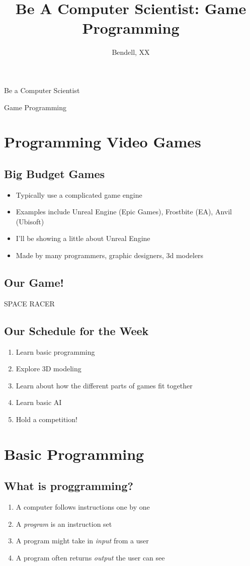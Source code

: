\documentclass[
paper=128mm:96mm,
fontsize=12pt,
pagesize,
parskip=half-,
]{scrartcl}
\title{Be A Computer Scientist: Game Programming}
\author{Bendell, XX}
\date{}
\newcommand{\slide}[1]{#1 \clearpage}
\newcommand{\sectionslide}[1]{\slide{\hfill \vfill \section{#1} \vspace{5em}}}
\newcommand{\subsectionslide}[2]{\vspace*{1em}\slide{\subsection{#1} #2}}
\renewcommand\maketitle
{
	\vspace*{3ex}
	\begin{center}
		{\Huge Be a Computer Scientist \vspace*{.3em} \par}
		{\large Game Programming \par}
		\vspace*{2em}
	\end{center}
}
\begin{document}
	
	
	\slide
	{
		\maketitle	
	}
	
	\sectionslide{Programming Video Games}

	\subsectionslide{Big Budget Games}
	{
		\begin{itemize}
			\item Typically use a complicated game engine
			\item Examples include Unreal Engine (Epic Games), Frostbite (EA), Anvil (Ubisoft)
			\item I'll be showing a little about Unreal Engine
			\item Made by many programmers, graphic designers, 3d modelers
		\end{itemize}	
	}
	
	\subsectionslide{Our Game!}
	{	
		\vspace{4em}
		\begin{center}
			\begin{huge}
				SPACE RACER
			\end{huge}
		\end{center}
	}
	
	\subsectionslide{Our Schedule for the Week}
	{
		\begin{enumerate}
			\item Learn basic programming
			\item Explore 3D modeling
			\item Learn about how the different parts of games fit together
			\item Learn basic AI
			\item Hold a competition!
		\end{enumerate}
	}
	
	\sectionslide{Basic Programming}
	
	\subsectionslide{What is proggramming?}
	{
		\begin{enumerate}
			\item A computer follows instructions one by one
			\item A \textit{program} is an instruction set
			\item A program might take in \textit{input} from a user
			\item A program often returns \textit{output} the user can see
		\end{enumerate}	
	}
	
\end{document}
